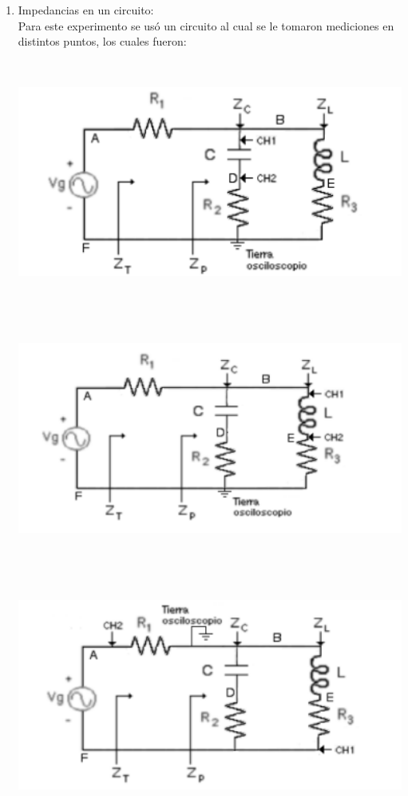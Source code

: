 \documentclass[12pt]{article}
\begin{document}
\begin{enumerate}
		\item Impedancias en un circuito:\\
		
		Para este experimento se usó un circuito al cual se le tomaron mediciones en distintos puntos, los cuales fueron:\\
		
		\begin{center}
			\includegraphics[width=16cm,height=8cm]{Img/circ_4}
		\end{center}
		
		\begin{center}
			\includegraphics[width=16cm,height=8cm]{Img/circ_5}
		\end{center}
		
		\begin{center}
			\includegraphics[width=16cm,height=8cm]{Img/circ_6}
		\end{center}
		

\end{enumerate}
\end{document}
